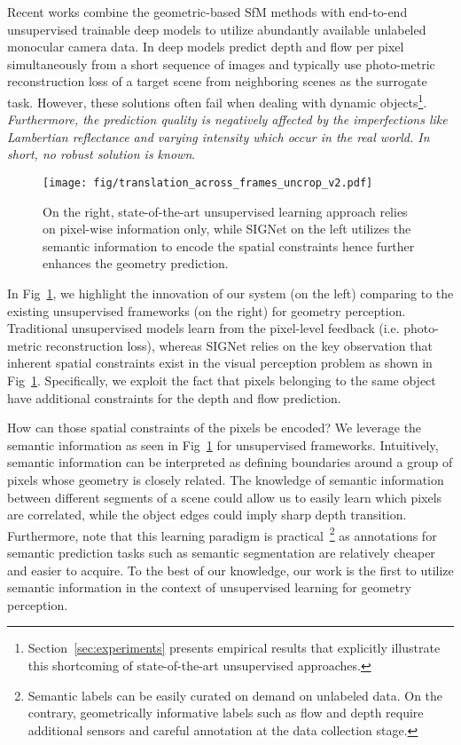 \documentclass[10pt,twocolumn]{article}
\newcommand{\name}{SIGNet\xspace}
\begin{document}
Recent works combine the geometric-based SfM methods with end-to-end unsupervised trainable deep models to utilize abundantly available unlabeled monocular camera data. In \cite{zhou2017unsupervised,vijayanarasimhan2017sfm,yin2018geonet,fei2018geo} deep models predict depth and flow per pixel simultaneously from a short sequence of images and typically use photo-metric reconstruction loss of a target scene from neighboring scenes as the surrogate task. However, these solutions often fail when dealing with dynamic objects\footnote{Section~\ref{sec:experiments} presents empirical results that 
explicitly illustrate this shortcoming of state-of-the-art unsupervised approaches.}.
 \textit{Furthermore, the prediction quality is negatively affected by the imperfections like Lambertian reflectance and varying intensity which occur in the real world. In short, no robust solution is known}.  

\begin{figure}[!t]
    \centering
    \texttt{[image: fig/translation\_across\_frames\_uncrop\_v2.pdf]}
    \caption{On the right, state-of-the-art unsupervised learning approach relies on pixel-wise information only, while \name on the left utilizes the semantic information to encode the spatial constraints hence further enhances the geometry prediction.}
    \label{fig:translation_across_frames}
\end{figure}

In Fig~\ref{fig:translation_across_frames}, we highlight the innovation of our system (on the left) comparing to the existing unsupervised frameworks (on the right) for geometry perception. Traditional unsupervised models learn from the pixel-level feedback (i.e. photo-metric reconstruction loss), whereas \name relies on the key observation that inherent spatial constraints exist in the visual perception problem as shown in Fig~\ref{fig:translation_across_frames}. Specifically, we exploit the fact that pixels belonging to the same object have additional constraints for the depth and flow prediction.

How can those spatial constraints of the pixels be encoded? We leverage the semantic information as seen in Fig~\ref{fig:translation_across_frames} for unsupervised frameworks. Intuitively, semantic information can be interpreted as defining boundaries around a group of pixels whose geometry is closely related. The knowledge of semantic information between different segments of a scene could allow us to easily learn which pixels are correlated, while the object edges could imply sharp depth transition. Furthermore, note that this learning paradigm is practical~\footnote{Semantic labels can be easily curated on demand  on unlabeled data. On the contrary, geometrically informative labels such as flow and depth require additional sensors and careful annotation at the data collection stage.} as annotations for semantic prediction tasks such as semantic segmentation are relatively cheaper and easier to acquire. To the best of our knowledge, our work is the first to utilize semantic information in the context of unsupervised learning for geometry perception. 
\end{document}
